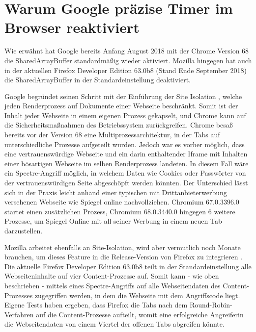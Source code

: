 

\section{Warum Google präzise Timer im Browser reaktiviert}
\label{GooglePageIsolation}

Wie erwähnt hat Google bereits Anfang August 2018 mit der Chrome Version 68 \cite{ChromeSharedArrayBufferAgain} die SharedArrayBuffer standardmäßig wieder aktiviert.
Mozilla hingegen hat auch in der aktuellen Firefox Developer Edition 63.0b8 (Stand Ende September 2018) die SharedArrayBuffer in der Standardeinstellung deaktiviert.

Google begründet seinen Schritt mit der Einführung der Site Isolation \cite{ChromeSiteIsolation}, welche jeden Renderprozess auf Dokumente einer Webseite beschränkt. Somit ist der Inhalt jeder Webseite in einem eigenen Prozess gekapselt, und Chrome kann auf die Sicherheitsmaßnahmen des Betriebssystem zurückgreifen.
Chrome besaß bereits vor der Version 68 eine Multiprozessarchitektur, in der Tabs auf unterschiedliche Prozesse aufgeteilt wurden.
Jedoch war es vorher möglich, dass eine vertrauenswürdige Webseite und ein darin enthaltender Iframe mit Inhalten einer bösartigen Webseite im selben Renderprozess landeten.
In diesem Fall wäre ein Spectre-Angriff möglich, in welchem Daten wie Cookies oder Passwörter von der vertrauenswürdigen Seite abgeschöpft werden könnten.
Der Unterschied lässt sich in der Praxis leicht anhand einer typischen mit Drittanbieterwerbung versehenen Webseite wie Spiegel online nachvollziehen.
Chromium 67.0.3396.0 startet einen zusätzlichen Prozess, Chromium 68.0.3440.0 hingegen 6 weitere Prozesse, um Spiegel Online mit all seiner Werbung in einem neuen Tab darzustellen.


Mozilla arbeitet ebenfalls an Site-Isolation, wird aber vermutlich noch Monate brauchen, um dieses Feature in die Release-Version von Firefox zu integrieren \cite{FirefoxSiteIsolation}.
Die aktuelle Firefox Developer Edition 63.0b8 teilt in der Standardeinstellung alle Webseiteninhalte auf vier Content-Prozesse auf. 
Somit kann - wie oben beschrieben - mittels eines Spectre-Angriffs auf alle Webseitendaten des Content-Prozesses zugegriffen werden, in dem die Webseite mit dem Angriffscode liegt.
Eigene Tests haben ergeben, dass Firefox die Tabs nach dem Round-Robin-Verfahren auf die Content-Prozesse aufteilt, womit eine erfolgreiche Angreiferin die Webseitendaten von einem Viertel der offenen Tabs abgreifen könnte.

